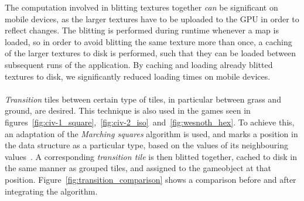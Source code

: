 The computation involved in blitting textures together \textit{can} be significant on mobile devices, as the larger textures have to be uploaded to the GPU in order to reflect changes.
The blitting is performed during runtime whenever a map is loaded, so in order to avoid blitting the same texture more than once, a caching of the larger textures to disk is performed, such that they can be loaded between subsequent runs of the application.
By caching and loading already blitted textures to disk, we significantly reduced loading times on mobile devices.
\\
\\
\textit{Transition} tiles between certain type of tiles, in particular between grass and ground, are desired.
This technique is also used in the games seen in figures~\ref{fig:civ-1_square},~\ref{fig:civ-2_iso}~and~\ref{fig:wesnoth_hex}.
To achieve this, an adaptation of the \textit{Marching squares} algorithm is used, and marks a position in the data structure as a particular type, based on the values of its neighbouring values~\cite{marching-squares}.
A corresponding \textit{transition tile} is then blitted together, cached to disk in the same manner as grouped tiles, and assigned to the gameobject at that position.
Figure~\ref{fig:transition_comparison} shows a comparison before and after integrating the algorithm.

